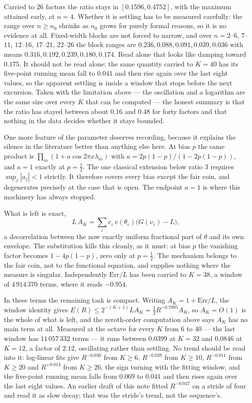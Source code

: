 \documentclass[11pt]{article}
\theoremstyle{remark}
\newcommand{\lam}{\lambda}
\newcommand{\eps}{\varepsilon}
\begin{document}
Carried to $26$ factors the ratio stays in $[0.1596,0.4752]$, with the maximum attained early, at $n=4$.
Whether it is settling has to be measured carefully: the range over $n\ge n_0$ shrinks as $n_0$ grows for
purely formal reasons, so it is no evidence at all. Fixed-width blocks are not forced to narrow, and over
$n=2$--$6$, $7$--$11$, $12$--$16$, $17$--$21$, $22$--$26$ the block ranges are
$0.236,0.088,0.091,0.039,0.036$ with means $0.316,0.192,0.239,0.180,0.174$. Read alone that looks like
damping toward $0.175$. It should not be read alone: the same quantity carried to $K=40$ has its
five-point running mean fall to $0.041$ and then rise again over the last eight values, so the apparent
settling is inside a window that stops before the next excursion. Taken with the limitation above --- the
oscillation and a logarithm are the same size over every $K$ that can be computed --- the honest summary
is that the ratio has stayed between about $0.16$ and $0.48$ for forty factors and that nothing in the
data decides whether it stays bounded.

One more feature of the parameter deserves recording, because it explains the silence in the literature
better than anything else here. At bias $p$ the same product is $\prod_m(1+a\cos2\pi x\lam_m)$ with
$a=2p(1-p)/(1-2p(1-p))$, and $a=1$ exactly at $p=\tfrac12$. The one classical extension below ratio $3$
requires $\sup_j|a_j|<1$ strictly. It therefore covers every bias except the fair coin, and degenerates
precisely at the case that is open. The endpoint $a=1$ is where this machinery has always stopped.

What is left is exact,
\[
  L\,A_K=\sum_\eps c_\eps\,e(\theta_\eps)\bigl(G(\nu_\eps)-L\bigr),
\]
a decorrelation between the now exactly uniform fractional part of $\theta$ and its own envelope. The
substitution kills this cleanly, as it must: at bias $p$ the vanishing factor becomes $1-4p(1-p)$, zero
only at $p=\tfrac12$. The mechanism belongs to the fair coin, not to the functional equation, and
supplies nothing where the measure is singular. Independently $\mathrm{Err}/L$ has been carried to
$K=38$, a window of $4\,914\,370$ terms, where it reads $-0.954$.

In these terms the remaining task is compact. Writing $A_K=1+\mathrm{Err}/L$, the window identity gives
$E(R)\le2^{-(K+1)}LA_K=\tfrac12R^{-0.7095}A_K$, so $A_K=O(1)$ is the whole of what is left, and the
zeroth-order computation above says $A_K$ has no main term at all. Measured at the octave for every $K$
from $6$ to $40$ --- the last window has $11\,057\,332$ terms --- it runs between $0.0399$ at $K=32$ and
$0.0846$ at $K=12$, a factor of $2.12$, oscillating rather than settling. No trend should be read into
it: log-linear fits give $R^{-0.030}$ from $K\ge6$, $R^{-0.039}$ from $K\ge10$, $R^{-0.011}$ from
$K\ge20$ and $R^{+0.014}$ from $K\ge26$, the sign turning with the fitting window, and the five-point
running mean falls from $0.069$ to $0.041$ and then rises again over the last eight values. An earlier
draft of this note fitted $R^{-0.047}$ on a stride of four and read it as slow decay; that was the
stride's trend, not the sequence's.
\end{document}
